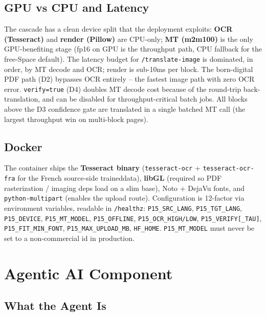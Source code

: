 \documentclass[12pt,a4paper]{article}
\begin{document}
\subsection{GPU vs CPU and Latency}

The cascade has a clean device split that the deployment exploits: \textbf{OCR (Tesseract)} and \textbf{render (Pillow)} are CPU-only; \textbf{MT (m2m100)} is the only GPU-benefiting stage (fp16 on GPU is the throughput path, CPU fallback for the free-Space default). The latency budget for \texttt{/translate-image} is dominated, in order, by MT decode and OCR; render is sub-10ms per block. The born-digital PDF path (D2) bypasses OCR entirely -- the fastest image path with zero OCR error. \texttt{verify=true} (D4) doubles MT decode cost because of the round-trip back-translation, and can be disabled for throughput-critical batch jobs. All blocks above the D3 confidence gate are translated in a single batched MT call (the largest throughput win on multi-block pages).

\subsection{Docker}

The container ships the \textbf{Tesseract binary} (\texttt{tesseract-ocr} + \texttt{tesseract-ocr-fra} for the French source-side traineddata), \textbf{libGL} (required so PDF rasterization / imaging deps load on a slim base), Noto + DejaVu fonts, and \texttt{python-multipart} (enables the upload route). Configuration is 12-factor via environment variables, readable in \texttt{/healthz}: \texttt{P15\_SRC\_LANG}, \texttt{P15\_TGT\_LANG}, \texttt{P15\_DEVICE}, \texttt{P15\_MT\_MODEL}, \texttt{P15\_OFFLINE}, \texttt{P15\_OCR\_HIGH/LOW}, \texttt{P15\_VERIFY[\_TAU]}, \texttt{P15\_FIT\_MIN\_FONT}, \texttt{P15\_MAX\_UPLOAD\_MB}, \texttt{HF\_HOME}. \texttt{P15\_MT\_MODEL} must never be set to a non-commercial id in production.

\section{Agentic AI Component}

\subsection{What the Agent Is}
\end{document}
